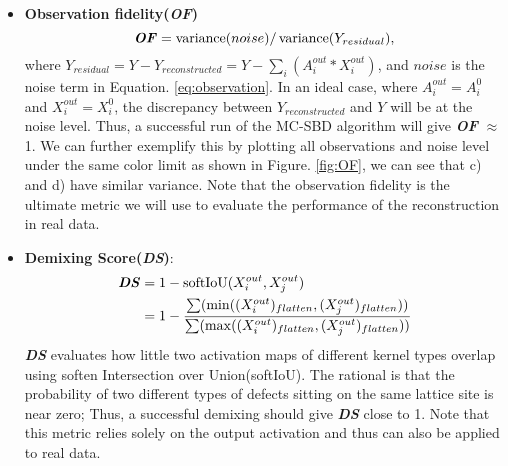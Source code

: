 \begin{itemize}
	\item \textbf{Observation fidelity(\textit{OF})}
	\begin{equation}
		\textbf{\textit{OF}} = \operatorname{variance}(noise)/\operatorname{variance}(Y_{residual}),
	\end{equation}
	where $Y_{residual} = Y - Y_{reconstructed} = Y - \sum_i(A^{out}_i * X^{out}_i)$, and $noise$ is the noise term in Equation. \ref{eq:observation}. In an ideal case, where $A^{out}_i = A^{0}_i$ and $X^{out}_i = X^{0}_i$, the discrepancy between $Y_{reconstructed}$ and $Y$ will be at the noise level. Thus, a successful run of the \ac{MC-SBD} algorithm will give \textbf{\textit{OF}} $\approx$ 1. We can further exemplify this by plotting all observations and noise level under the same color limit as shown in Figure. \ref{fig:OF}, we can see that c) and d) have similar variance. Note that the observation fidelity is the ultimate metric we will use to evaluate the performance of the reconstruction in real data. 
	
	\item \textbf{Demixing Score(\textit{DS})}:
	\begin{align}
		\textbf{\textit{DS}} &= 1 - \operatorname{softIoU}(X_i^{out},X_j^{out}) \\
		&= 1 - \frac{\sum(\operatorname{min}((X_i^{out})_{flatten}, (X_j^{out})_{flatten}))}{\sum(\operatorname{max}((X_i^{out})_{flatten}, (X_j^{out})_{flatten}))}
	\end{align}
	\textbf{\textit{DS}} evaluates how little two activation maps of different kernel types overlap using soften Intersection over Union(softIoU). The rational is that the probability of two different types of defects sitting on the same lattice site is near zero; Thus, a successful demixing should give \textbf{\textit{DS}} close to 1. Note that this metric relies solely on the output activation and thus can also be applied to real data.  
\end{itemize}

